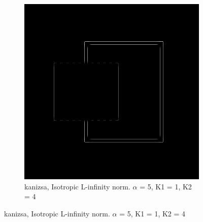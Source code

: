 \begin{figure}[H]
  \centering
  
    \begin{subfigure}{.7\textwidth}
    \centering
    \includegraphics[width=.9\textwidth]{./canny/kanizsa_LINF_a5_k11_k24}
    \caption{kanizsa, Isotropic L-infinity norm. $\alpha$ = 5, K1 = 1, K2 = 4}
    \label{fig:kanizsa_LINF_a5_k11_k24}
  \end{subfigure}%

\end{figure}

